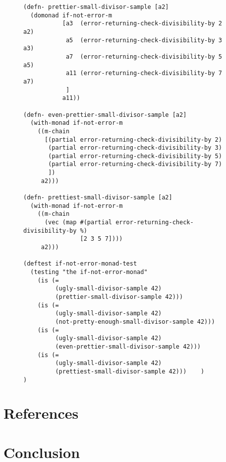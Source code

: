 \documentclass[11pt]{article}
\begin{document}
\begin{figure}[H]
\begin{verbatim}
(defn- prettier-small-divisor-sample [a2]
  (domonad if-not-error-m
           [a3  (error-returning-check-divisibility-by 2 a2)
            a5  (error-returning-check-divisibility-by 3 a3)
            a7  (error-returning-check-divisibility-by 5 a5)
            a11 (error-returning-check-divisibility-by 7 a7)
            ]
           a11))

(defn- even-prettier-small-divisor-sample [a2]
  (with-monad if-not-error-m
    ((m-chain
      [(partial error-returning-check-divisibility-by 2)
       (partial error-returning-check-divisibility-by 3)
       (partial error-returning-check-divisibility-by 5)
       (partial error-returning-check-divisibility-by 7)
       ])
     a2)))

(defn- prettiest-small-divisor-sample [a2]
  (with-monad if-not-error-m
    ((m-chain
      (vec (map #(partial error-returning-check-divisibility-by %)
                [2 3 5 7])))
     a2)))

(deftest if-not-error-monad-test
  (testing "the if-not-error-monad"
    (is (=
         (ugly-small-divisor-sample 42)
         (prettier-small-divisor-sample 42)))
    (is (=
         (ugly-small-divisor-sample 42)
         (not-pretty-enough-small-divisor-sample 42)))
    (is (=
         (ugly-small-divisor-sample 42)
         (even-prettier-small-divisor-sample 42)))
    (is (=
         (ugly-small-divisor-sample 42)
         (prettiest-small-divisor-sample 42)))    )
)
\end{verbatim}
\end{figure}
\section{References}
\label{sec-5}

\section{Conclusion}
\label{sec-6}
\end{document}

